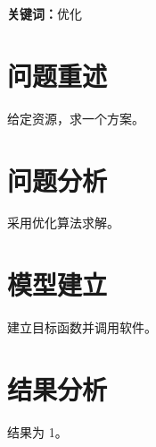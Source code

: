 \documentclass{ctexart}
\newcommand{\keywords}[1]{\par\noindent\textbf{关键词：}#1}
\begin{document}
\begin{abstract}本文建立一个优化模型。\end{abstract}
\keywords{优化}
\section{问题重述}
给定资源，求一个方案。
\section{问题分析}
采用优化算法求解。
\section{模型建立}
建立目标函数并调用软件。
\section{结果分析}
结果为 1。
\end{document}
